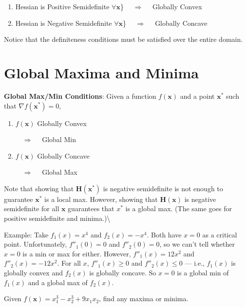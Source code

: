 \documentclass[]{book}
\providecommand{\tightlist}{%
  \setlength{\itemsep}{0pt}\setlength{\parskip}{0pt}}
\theoremstyle{definition}
\theoremstyle{definition}
\theoremstyle{definition}
\theoremstyle{remark}
\let\BeginKnitrBlock\begin \let\EndKnitrBlock\end
\begin{document}
\begin{enumerate}
\def\labelenumi{\arabic{enumi}.}
\tightlist
\item
  Hessian is Positive Semidefinite \(\forall \mathbf{x}\)\}
  \(\quad \Longrightarrow \quad\) Globally Convex
\item
  Hessian is Negative Semidefinite \(\forall \mathbf{x}\)\}
  \(\quad \Longrightarrow \quad\) Globally Concave
\end{enumerate}

Notice that the definiteness conditions must be satisfied over the
entire domain.

\section{Global Maxima and Minima}\label{global-maxima-and-minima}

\textbf{Global Max/Min Conditions}: Given a function \(f(\mathbf{x})\)
and a point \(\mathbf{x}^*\) such that \(\nabla f(\mathbf{x}^*)=0\),

\begin{enumerate}
  \item \parbox[t]{2in}{$f(\mathbf{x})$ Globally Convex} $\quad
\Longrightarrow \quad$ Global Min
  \item \parbox[t]{2in}{$f(\mathbf{x})$ Globally Concave} $\quad
\Longrightarrow \quad$ Global Max
\end{enumerate}

Note that showing that \(\mathbf{H(x^*)}\) is negative semidefinite is
not enough to guarantee \(\mathbf{x}^*\) is a local max. However,
showing that \(\mathbf{H(x)}\) is negative semidefinite for all
\(\mathbf{x}\) guarantees that \(x^*\) is a global max. (The same goes
for positive semidefinite and minima.)\textbackslash{}

Example: Take \(f_1(x)=x^4\) and \(f_2(x)=-x^4\). Both have \(x=0\) as a
critical point. Unfortunately, \(f''_1(0)=0\) and \(f''_2(0)=0\), so we
can't tell whether \(x=0\) is a min or max for either. However,
\(f''_1(x)=12x^2\) and \(f''_2(x)=-12x^2\). For all \(x\),
\(f''_1(x)\ge 0\) and \(f''_2(x)\le 0\) --- i.e., \(f_1(x)\) is globally
convex and \(f_2(x)\) is globally concave. So \(x=0\) is a global min of
\(f_1(x)\) and a global max of \(f_2(x)\).

\BeginKnitrBlock{exercise}
\protect\hypertarget{exr:unnamed-chunk-59}{}{\label{exr:unnamed-chunk-59}
}Given \(f(\mathbf{x})=x_1^3-x_2^3+9x_1x_2\), find any maxima or minima.
\EndKnitrBlock{exercise}
\end{document}
